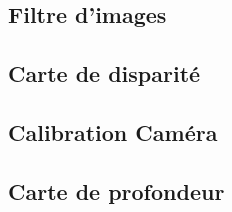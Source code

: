 \documentclass{article}
\begin{document}
\subsection{Filtre d'images}


\newpage
\subsection{Carte de disparité}


\newpage
\subsection{Calibration Caméra}


\newpage
\subsection{Carte de profondeur}

\end{document}
